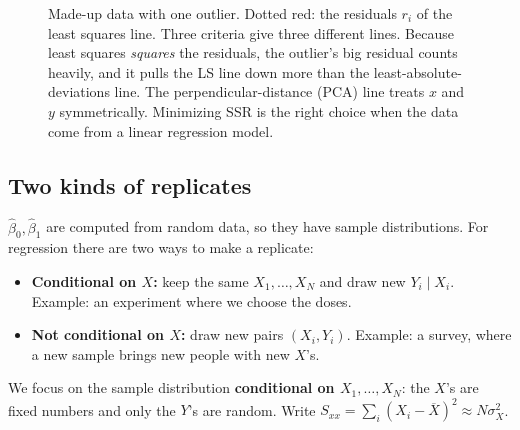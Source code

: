 \documentclass[11pt]{article}
\newcommand{\given}{\mid}
\newcommand{\Xbar}{\overline{X}}
\begin{document}
\begin{figure}[h]
\centering
{}
\caption{Made-up data with one outlier. Dotted red: the residuals $r_i$ of the least squares line. Three criteria give three different
lines. Because least squares \emph{squares} the residuals, the outlier's big residual counts heavily, and it pulls the LS line down
more than the least-absolute-deviations line. The perpendicular-distance (PCA) line treats $x$ and $y$ symmetrically. Minimizing SSR is the
right choice when the data come from a linear regression model.}
\end{figure}

\subsection{Two kinds of replicates}
$\hat\beta_0,\hat\beta_1$ are computed from random data, so they have sample distributions. For regression there are two ways to make a replicate:
\begin{itemize}[leftmargin=*,itemsep=2pt]
\item \textbf{Conditional on $X$:} keep the same $X_1,\dots,X_N$ and draw new $Y_i\given X_i$. Example: an experiment where we choose the doses.
\item \textbf{Not conditional on $X$:} draw new pairs $(X_i,Y_i)$. Example: a survey, where a new sample brings new people with new $X$'s.
\end{itemize}
We focus on the sample distribution \textbf{conditional on $X_1,\dots,X_N$}: the $X$'s are fixed numbers and only the $Y$'s are random.
Write $S_{xx}=\sum_i(X_i-\Xbar)^2\approx N\sigma_X^2$.
\end{document}
